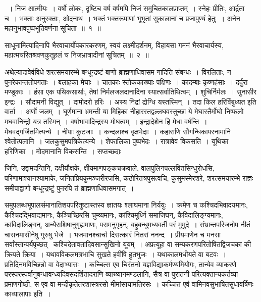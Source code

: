 \documentclass[11pt, openany]{book}
\begin{document}
{~। निज आत्मीयः~। वर्षो लोकः, दृष्टिच वर्ष वर्षमपि निजं समुचितकालप्राप्तम्~। स्नेहः प्रीतिः, आर्द्रता च~। भक्ताः अनुरक्ताः, ओदनाथ~। भक्तं भक्तरूपाणां भूभृतां सुकालानां च प्रजापुण्यं हेतुः~। अनेन महानुभावपुष्पभूतिवर्णना सूचिता~॥~१~॥

{\qtt साधूनामित्यादिनापि} भैरवाचार्योपकारकरणम्, स्वयं लक्ष्मीदर्शनम्, विहायसा गमनं भैरवाचार्यस्य, महात्मचरितश्रवणकुतूहलं च निजभ्रात्रादीनां सूचितम्~॥~२~॥

अथेल्यादावेवंविधे शरत्समयारम्भे बन्धून्द्रष्टं बाणो ब्राह्मणाधिवासम गादिति संबन्धः~। विरलिताः, न पुनरेकान्ततोपगताः~। बलाहका मेघाः~। चातकाः स्तोककाख्याः पक्षिणः~। कादम्बाः कृष्णहंसाः~। दर्दुरा मण्डूकाः~। हंसा एक पथिकसार्थाः, तेषां निर्मलजलदानादिना स्यात्सर्वातिथित्वम्~। शुचिर्निर्मलः~। सुनासीर इन्द्रः~। सौदामनी विद्युत्~। दामोदरो हरिः~। अस्य निद्रां द्रोग्धि यस्तस्मिन्~। तदा किल हरिर्विबुध्यत इति वार्ता~। अर्णो जलम्~। घूर्णमाना भ्रमन्ती या मिहिका नीहाररतद्वल्लघवस्तुच्छा ये मेघास्तैर्मोघो निष्फलो मघवानिन्द्रो यत्र तस्मिन्~। वर्षाभावादिन्द्रस्य मोघत्वम्~। इन्द्रादेशेन हि मेधा वर्षन्ति~। मेघवद्गर्जितमित्यन्ये~। नीपाः कुटजाः~। कन्दलाश्च वृक्षभेदाः~। कहाराणि सौगन्धिकापरनामानि श्वेतोत्पलानि~। जलकुसुमपत्रिकेत्यन्ये~। शेफालिका पुष्पभेदः~। रात्रावेव विकसति~। यूथिका हरिणिका~। मोदमानानि विकसन्ति~। सप्तच्छदाः}

\newpage

\noindent
जिनि, उद्दामदन्तिनि, दक्षीयौक्षके, क्षीयमाणपङ्कचक्रवाले, वालपुलिनपल्लवितसिन्धुरोधसि, परिणामाश्यानश्यामाके, जनितप्रियकुमञ्जरीरजसि, कठोरितत्रपुसत्वचि, कुसुमस्मेरशरे, शरत्समयारम्भे राज्ञः समीपाद्वाणो बन्धून्द्रष्टुं पुनरपि तं ब्राह्मणाधिवासमगात्~।

समुपलब्धभूपालसंमानातिशयपरितुष्टास्तस्य ज्ञातयः श्लाघमाना निर्ययुः~। क्रमेण च कश्चिदभिवादयमानः, कैश्चिदद्भिवाद्यमानः, कैञ्चिच्छिरसि चुम्व्यमानः, कांश्चिमूर्ध्नि समाजिघन्, कैविदालिङ्ग्यमानः, कांविदालिङ्गन्, अन्यैराशिषानुगृह्यमाणः, परामनुगृहन्, बहुबन्धुमध्यवर्ती परं मुमुदे~। संभ्रान्तपरिजनोप नीतं चासनमासीनेषु गुरुषु भेजे~। भजमानश्चार्चा दिसत्कारं नितरां ननन्द~। प्रीयमाणेन च मनसा सर्वांस्तान्पर्यपृच्छत् \textendash\ कश्चिदेतावतादिवसान्सुखिनो यूयम्~। अप्रत्यूहा वा सम्यकरणपरितोषितद्विजचका की क्रियते क्रिया~। यथावविकलमत्रभाचि सुखते हवींषि हुतभुजः~। यथाकालमधीयते वा बटवः~। प्रतिदिनमविच्छिन्नो वा वेदाभ्यासः~। कच्चित्स एव चिरंतनो यज्ञविद्याकर्मण्यमियोगः, तान्येव व्याकरणे परस्परस्पर्वानुबन्धावन्ध्यदिवसदर्शितादराणि व्याख्यानमण्डलानि, सैत्र वा पुरातनी परित्यक्तान्यकर्तव्या प्रमाणगोष्ठी, स एव वा मन्दीकृतेतरशास्त्ररसो मीमांसायामतिरसः~। कच्चित्त एवं वामिनवसुभाषितसुधावर्षिणः काव्यालापाः इति~।
\end{document}
